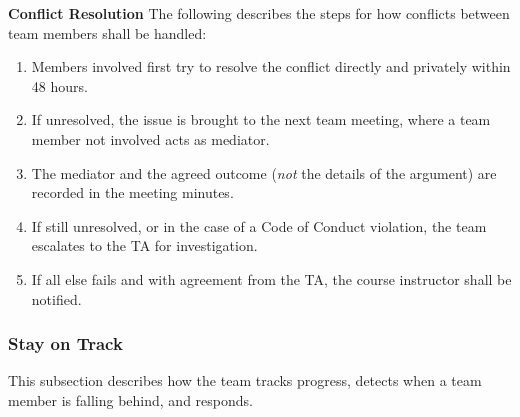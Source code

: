 \documentclass{article}
\begin{document}
\textbf{Conflict Resolution} \newline
The following describes the steps for how conflicts between team members shall be handled:
\begin{enumerate}
    \item Members involved first try to resolve the conflict directly and privately within 48 hours.
    \item If unresolved, the issue is brought to the next team meeting, where a team member not involved acts as mediator.
    \item The mediator and the agreed outcome (\emph{not} the details of the argument) are recorded in the meeting minutes.
    \item If still unresolved, or in the case of a Code of Conduct violation, the team escalates to the TA for investigation.
    \item If all else fails and with agreement from the TA, the course instructor shall be notified.
\end{enumerate}

\subsubsection*{Stay on Track}

This subsection describes how the team tracks progress, detects when a team member is falling behind, and responds.
\end{document}
